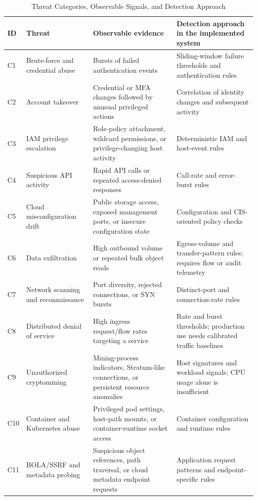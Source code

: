 \documentclass[conference]{IEEEtran}
\begin{document}
\begin{table}[t]
\centering
\caption{Threat Categories, Observable Signals, and Detection Approach}
\label{tab:threats}
\scriptsize
\begin{tabular}{p{0.55cm}p{2.65cm}p{5.0cm}p{5.0cm}}
\toprule
\textbf{ID} & \textbf{Threat} & \textbf{Observable evidence} & \textbf{Detection approach in the implemented system}\\
\midrule
C1 & Brute-force and credential abuse & Bursts of failed authentication events & Sliding-window failure thresholds and authentication rules\\
C2 & Account takeover & Credential or MFA changes followed by unusual privileged actions & Correlation of identity changes and subsequent activity\\
C3 & IAM privilege escalation & Role-policy attachment, wildcard permissions, or privilege-changing host activity & Deterministic IAM and host-event rules\\
C4 & Suspicious API activity & Rapid API calls or repeated access-denied responses & Call-rate and error-burst rules\\
C5 & Cloud misconfiguration drift & Public storage access, exposed management ports, or insecure configuration state & Configuration and CIS-oriented policy checks\\
C6 & Data exfiltration & High outbound volume or repeated bulk object reads & Egress-volume and transfer-pattern rules; requires flow or audit telemetry\\
C7 & Network scanning and reconnaissance & Port diversity, rejected connections, or SYN bursts & Distinct-port and connection-rate rules\\
C8 & Distributed denial of service & High ingress request/flow rates targeting a service & Rate and burst thresholds; production use needs calibrated traffic baselines\\
C9 & Unauthorized cryptomining & Mining-process indicators, Stratum-like connections, or persistent resource anomalies & Host signatures and workload signals; CPU usage alone is insufficient\\
C10 & Container and Kubernetes abuse & Privileged pod settings, host-path mounts, or container-runtime socket access & Container configuration and runtime rules\\
C11 & BOLA/SSRF and metadata probing & Suspicious object references, path traversal, or cloud metadata endpoint requests & Application request patterns and endpoint-specific rules\\

\end{tabular}
\end{table}
\end{document}
